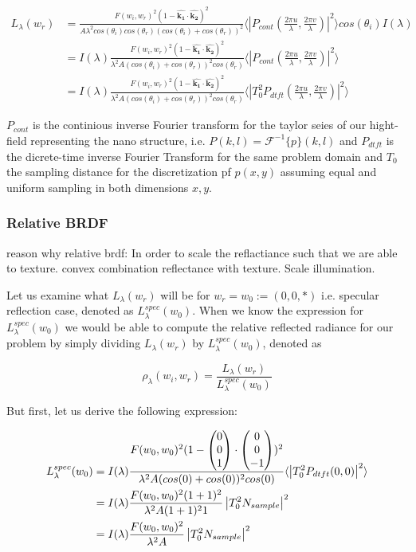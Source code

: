 \begin{align*}
L_{\lambda}(w_r) 
& = \frac{F(w_i, w_r)^2 (1-\hat{\mathbf{k_1}}\cdot\hat{ \mathbf{k_2}})^2}{A \lambda^2 cos(\theta_i)cos(\theta_r)  (cos(\theta_i)+cos(\theta_r))^2} \langle \left|P_{cont}(\frac{2\pi u}{\lambda}, \frac{2\pi v}{\lambda})  \right|^2\rangle cos(\theta_i) I(\lambda) \\
& = I(\lambda) \frac{F(w_i, w_r)^2 (1-\hat{\mathbf{k_1}}\cdot\hat{\mathbf{k_2}})^2}{\lambda^2 A (cos(\theta_i)+cos(\theta_r))^2 cos(\theta_r)} \langle \left|P_{cont}(\frac{2\pi u}{\lambda}, \frac{2\pi v}{\lambda})  \right|^2\rangle \\
& = I(\lambda) \frac{F(w_i, w_r)^2 (1-\hat{\mathbf{k_1}}\cdot\hat{\mathbf{k_2}})^2}{\lambda^2 A (cos(\theta_i)+cos(\theta_r))^2 cos(\theta_r)} \langle \left|T_0^2 P_{dtft}(\frac{2\pi u}{\lambda}, \frac{2\pi v}{\lambda})  \right|^2\rangle
\end{align*}

$P_{cont}$ is the continious inverse Fourier transform for the taylor seies of our hight-field representing the nano structure, i.e. $P(k,l) = \mathcal{F}^{-1}\{p\}(k,l)$ and $P_{dtft}$ is the dicrete-time inverse Fourier Transform for the same problem domain and $T_0$ the sampling distance for the discretization pf $p(x,y)$ assuming equal and uniform sampling in both dimensions $x,y$.



\subsubsection{Relative BRDF}
reason why relative brdf: In order to scale the reflactiance such that we are able to texture. 
convex combination reflectance with texture. Scale illumination.

Let us examine what $L_\lambda(w_r)$ will be for $w_r = w_0 := (0,0,*)$ i.e. specular reflection case, denoted as $L_\lambda^{spec}(w_0)$. 
When we know the expression for $L_\lambda^{spec}(w_0)$ we would be able to compute the relative reflected radiance for our problem by simply dividing $L_\lambda(w_r)$ by $L_\lambda^{spec}(w_0)$, denoted as 

\begin{equation}
    \rho_\lambda(w_i,w_r) = \frac{L_\lambda(w_r)}{L_\lambda^{spec}(w_0)}
\end{equation}

But first, let us derive the following expression:

\begin{align*}
L_\lambda^{spec}(w_0) 
& = I(\lambda) \frac{F(w_0, w_0)^2 (1-\colvec[0]{0}{1}\cdot\colvec[0]{0}{-1})^2}{\lambda^2 A (cos(0)+cos(0))^2 cos(0)} \langle \left|T_0^2 P_{dtft}(0,0)  \right|^2\rangle \\
& = I(\lambda) \frac{F(w_0, w_0)^2 (1+1)^2}{\lambda^2 A (1+1)^2 1}\left| T_0^2 N_{sample} \right|^2 \\
& = I(\lambda) \frac{F(w_0, w_0)^2}{\lambda^2 A}\left| T_0^2 N_{sample} \right|^2 
\end{align*}


